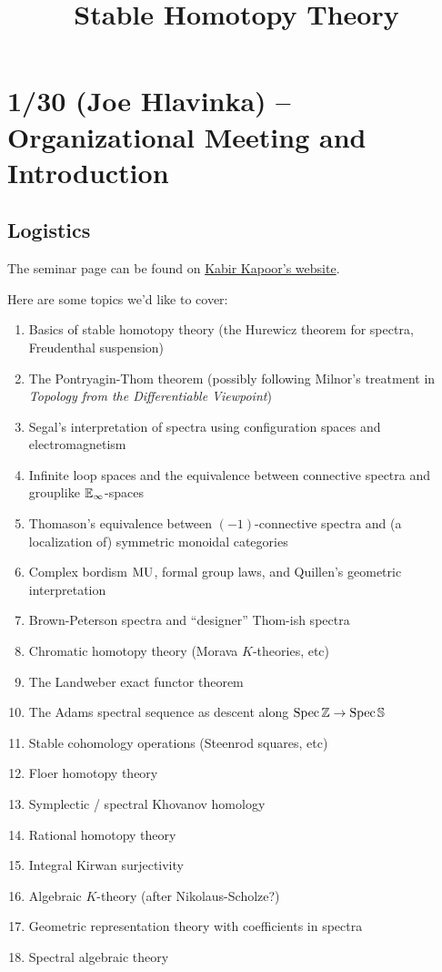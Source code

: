 \documentclass{article}
\title{Stable Homotopy Theory}
\begin{document}
\maketitle

\tableofcontents

\pagebreak

\section{1/30 (Joe Hlavinka) -- Organizational Meeting and Introduction}

\subsection{Logistics}

The seminar page can be found on \href{https://math.berkeley.edu/~kskapoor/seminars/spring2025/stableht}{Kabir Kapoor's website}.

Here are some topics we'd like to cover:

\begin{enumerate}
	\item Basics of stable homotopy theory (the Hurewicz theorem for spectra, Freudenthal suspension)
	\item The Pontryagin-Thom theorem (possibly following Milnor's treatment in \emph{Topology from the Differentiable Viewpoint})
	\item Segal's interpretation of spectra using configuration spaces and electromagnetism
	\item Infinite loop spaces and the equivalence between connective spectra and grouplike $\mathbb{E}_\infty$-spaces
	\item Thomason's equivalence between $(-1)$-connective spectra and (a localization of) symmetric monoidal categories
	\item Complex bordism $\mathrm{MU}$, formal group laws, and Quillen's geometric interpretation
	\item Brown-Peterson spectra and ``designer'' Thom-ish spectra
	\item Chromatic homotopy theory (Morava $K$-theories, etc)
	\item The Landweber exact functor theorem
	\item The Adams spectral sequence as descent along $\operatorname{Spec} \mathbb{Z} \to \operatorname{Spec} \mathbb{S}$
	\item Stable cohomology operations (Steenrod squares, etc)
	\item Floer homotopy theory
	\item Symplectic / spectral Khovanov homology
	\item Rational homotopy theory
	\item Integral Kirwan surjectivity
	\item Algebraic $K$-theory (after Nikolaus-Scholze?)
	\item Geometric representation theory with coefficients in spectra
	\item Spectral algebraic theory
\end{enumerate}
\end{document}
